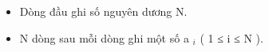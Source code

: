 \begin{itemize}
	\item     Dòng đầu ghi số nguyên dương N.   
	\item     N dòng sau mỗi dòng ghi một số a    $_     i    $    ( 1 ≤ i ≤ N ).   
\end{itemize}